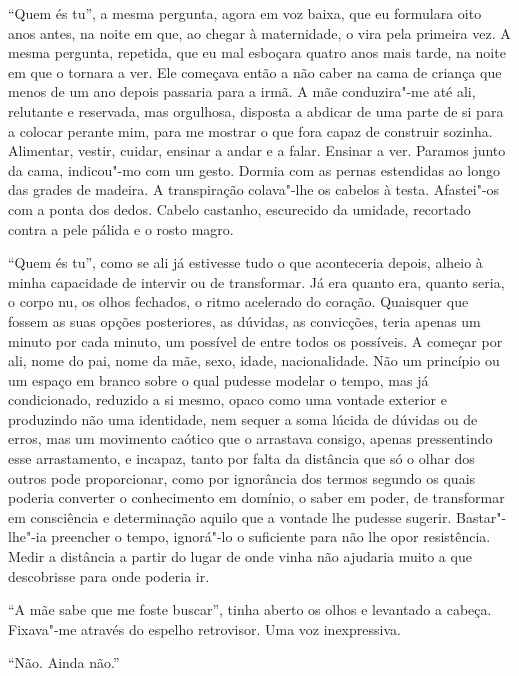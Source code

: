 ``Quem és tu'',
a mesma pergunta, agora em voz baixa, que eu formulara oito anos antes,
na noite em que, ao chegar à maternidade, o vira pela primeira vez. A
mesma pergunta, repetida, que eu mal esboçara quatro anos mais tarde, na
noite em que o tornara a ver. Ele começava então a não caber na cama de
criança que menos de um ano depois passaria para a irmã. A mãe
conduzira"-me até ali, relutante e reservada, mas orgulhosa, disposta a
abdicar de uma parte de si para a colocar perante mim, para me mostrar o
que fora capaz de construir sozinha. Alimentar, vestir, cuidar, ensinar
a andar e a falar. Ensinar a ver. Paramos junto da cama, indicou"-mo com
um gesto. Dormia com as pernas estendidas ao longo das grades de
madeira. A transpiração colava"-lhe os cabelos à testa. Afastei"-os
com a ponta dos dedos. Cabelo castanho, escurecido da umidade,
recortado contra a pele pálida e o rosto magro.

``Quem és tu'',
como se ali já estivesse tudo o que aconteceria depois, alheio à minha
capacidade de intervir ou de transformar. Já era quanto era, quanto
seria, o corpo nu, os olhos fechados, o ritmo acelerado do coração.
Quaisquer que fossem as suas opções posteriores, as dúvidas, as
convicções, teria apenas um minuto por cada minuto, um possível de entre
todos os possíveis. A começar por ali, nome do pai, nome da mãe, sexo,
idade, nacionalidade. Não um princípio ou um espaço em branco sobre o
qual pudesse modelar o tempo, mas já condicionado, reduzido a si mesmo,
opaco como uma vontade exterior e produzindo não uma identidade, nem
sequer a soma lúcida de dúvidas ou de erros, mas um movimento caótico
que o arrastava consigo, apenas pressentindo esse arrastamento, e
incapaz, tanto por falta da distância que só o olhar dos outros pode
proporcionar, como por ignorância dos termos segundo os quais poderia
converter o conhecimento em domínio, o saber em poder, de transformar em
consciência e determinação aquilo que a vontade lhe pudesse sugerir.
Bastar"-lhe"-ia preencher o tempo, ignorá"-lo o suficiente para não lhe
opor resistência. Medir a distância a partir do lugar de onde vinha não
ajudaria muito a que descobrisse para onde poderia ir.

``A mãe sabe que me foste buscar'',
tinha aberto os olhos e levantado a cabeça. Fixava"-me através do
espelho retrovisor. Uma voz inexpressiva.

``Não. Ainda não.''

